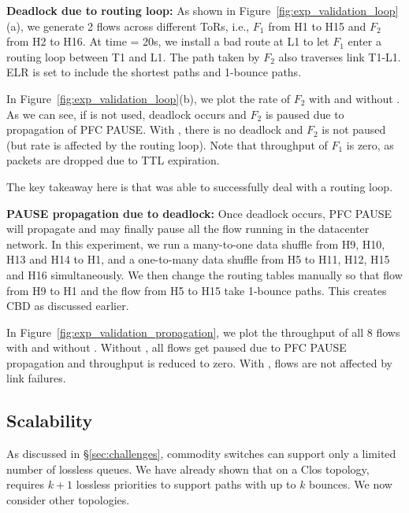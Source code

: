 \textbf{Deadlock due to routing loop:} As shown in
Figure~\ref{fig:exp_validation_loop}(a), we generate 2 flows across different
ToRs, i.e.,  $F_1$ from H1 to H15 and $F_2$ from H2 to H16. At time = 20s, we
install a bad route at L1 to let $F_1$ enter a routing loop between T1 and L1.
The path taken by $F_2$ also traverses link T1-L1.  ELR is set to include the
shortest paths and 1-bounce paths.

In Figure~\ref{fig:exp_validation_loop}(b), we plot the rate of $F_2$ with and
without \sysname{}. As we can see, if \sysname{} is not used, deadlock occurs
and $F_2$ is paused due to propagation of PFC PAUSE. With \sysname{}, there is
no deadlock and $F_2$ is not paused (but rate is affected by the routing loop). Note that
throughput of $F_1$ is zero, as packets are dropped due to TTL expiration.

The key takeaway here is that \sysname{} was able to successfully deal with a
routing loop.

\textbf{PAUSE propagation due to deadlock:} Once deadlock occurs, PFC PAUSE will
propagate and may finally pause all the flow running in the datacenter network.
In this experiment, we run a many-to-one data shuffle from H9, H10, H13 and H14
to H1, and a one-to-many data shuffle from H5 to  H11, H12, H15 and H16
simultaneously.  We then change the routing tables manually so that flow from H9
to H1 and the flow from H5 to H15 take 1-bounce paths. This creates CBD as
discussed earlier.

In Figure~\ref{fig:exp_validation_propagation}, we plot the throughput of all 8
flows with and without \sysname{}. Without \sysname{}, all flows get paused due
to PFC PAUSE propagation and throughput is reduced to zero. With \sysname{},
flows are not affected by link failures.

\subsection{Scalability}
\label{subsec:exp_overhead}

As discussed in \S\ref{sec:challenges}, commodity switches can support only a
limited number of lossless queues.  We have already shown that on a Clos
topology, \sysname{} requires $k+1$ lossless priorities to support paths with
up to $k$ bounces. We now consider other topologies.


